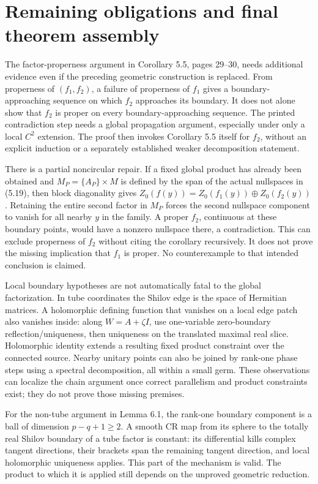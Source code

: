 \documentclass[10pt]{article}
\begin{document}
\section*{Remaining obligations and final theorem assembly}
The factor-properness argument in Corollary 5.5, pages 29–30, needs additional evidence even if the preceding geometric construction is replaced. From properness of \((f_1,f_2)\), a failure of properness of \(f_1\) gives a boundary-approaching sequence on which \(f_2\) approaches its boundary. It does not alone show that \(f_2\) is proper on every boundary-approaching sequence. The printed contradiction step needs a global propagation argument, especially under only a local \(C^2\) extension. The proof then invokes Corollary 5.5 itself for \(f_2\), without an explicit induction or a separately established weaker decomposition statement.\par
There is a partial noncircular repair. If a fixed global product has already been obtained and \(M_P=\{A_P\}\times M\) is defined by the span of the actual nullspaces in (5.19), then block diagonality gives \(Z_0(f(y))=Z_0(f_1(y))\oplus Z_0(f_2(y))\). Retaining the entire second factor in \(M_P\) forces the second nullspace component to vanish for all nearby \(y\) in the family. A proper \(f_2\), continuous at these boundary points, would have a nonzero nullspace there, a contradiction. This can exclude properness of \(f_2\) without citing the corollary recursively. It does not prove the missing implication that \(f_1\) is proper. No counterexample to that intended conclusion is claimed.\par
Local boundary hypotheses are not automatically fatal to the global factorization. In tube coordinates the Shilov edge is the space of Hermitian matrices. A holomorphic defining function that vanishes on a local edge patch also vanishes inside: along \(W=A+\zeta I\), use one-variable zero-boundary reflection/uniqueness, then uniqueness on the translated maximal real slice. Holomorphic identity extends a resulting fixed product constraint over the connected source. Nearby unitary points can also be joined by rank-one phase steps using a spectral decomposition, all within a small germ. These observations can localize the chain argument once correct parallelism and product constraints exist; they do not prove those missing premises.\par
For the non-tube argument in Lemma 6.1, the rank-one boundary component is a ball of dimension \(p-q+1\ge2\). A smooth CR map from its sphere to the totally real Shilov boundary of a tube factor is constant: its differential kills complex tangent directions, their brackets span the remaining tangent direction, and local holomorphic uniqueness applies. This part of the mechanism is valid. The product to which it is applied still depends on the unproved geometric reduction.\par
\end{document}

